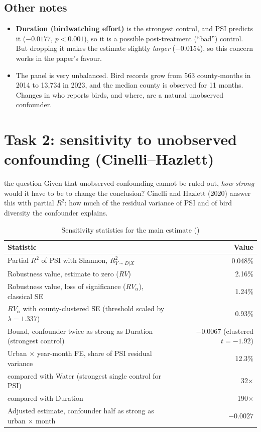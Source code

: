 \documentclass[11pt]{article}
\begin{document}
\subsection{Other notes}
\begin{itemize}
\item \textbf{Duration (birdwatching effort)} is the strongest control, and PSI predicts it ($-0.0177$, $p<0.001$), so it is a possible post-treatment (``bad'') control. But dropping it makes the estimate slightly \emph{larger} ($-0.0154$), so this concern works in the paper's favour.
\item The panel is very unbalanced. Bird records grow from 563 county-months in 2014 to 13,734 in 2023, and the median county is observed for 11 months. Changes in who reports birds, and where, are a natural unobserved confounder.
\end{itemize}

\section{Task 2: sensitivity to unobserved confounding (Cinelli--Hazlett)}

\begin{conceptbox}{the question}
Given that unobserved confounding cannot be ruled out, \emph{how strong} would it have to be to change the conclusion? Cinelli and Hazlett (2020) answer this with partial $R^2$: how much of the residual variance of PSI and of bird diversity the confounder explains.
\end{conceptbox}

\begin{table}[H]\centering\small
\caption{Sensitivity statistics for the main estimate ()}
\begin{tabularx}{\linewidth}{>{\raggedright\arraybackslash}Xr}
\toprule
Statistic & Value\\
\midrule
Partial $R^2$ of PSI with Shannon, $R^2_{Y\sim D|X}$ & 0.048\%\\
Robustness value, estimate to zero ($RV$) & 2.16\%\\
Robustness value, loss of significance ($RV_\alpha$), classical SE & 1.24\%\\
$RV_\alpha$ with county-clustered SE (threshold scaled by $\lambda=1.337$) & 0.93\%\\
Bound, confounder twice as strong as Duration (strongest control) & $-0.0067$ (clustered $t=-1.92$)\\
Urban $\times$ year-month FE, share of PSI residual variance & 12.3\%\\
\quad compared with Water (strongest single control for PSI) & 32$\times$\\
\quad compared with Duration & 190$\times$\\
Adjusted estimate, confounder half as strong as urban $\times$ month & $-0.0027$\\
\bottomrule
\end{tabularx}
\end{table}
\end{document}
